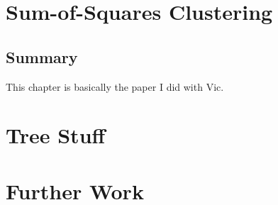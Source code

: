 \documentclass[a4paper]{report}
\begin{document}
\chapter{Sum-of-Squares Clustering}
\label{cha:sum-squar-clust}

\section{Summary}
\label{sec:summary-sum-squar}

This chapter is basically the paper I did with Vic.

\chapter{Tree Stuff}
\label{cha:tree-stuff}

\chapter{Further Work}
\label{cha:further-work}





\end{document}
